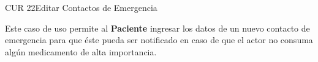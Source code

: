 \begin{UseCase}{CUR 22}{Editar Contactos de Emergencia}
    {
    	Este caso de uso permite al \textbf{Paciente} ingresar los datos de un nuevo contacto de emergencia para que éste pueda ser notificado en caso de que el actor no consuma algún medicamento de alta importancia.  
    	
    }


\end{UseCase}
